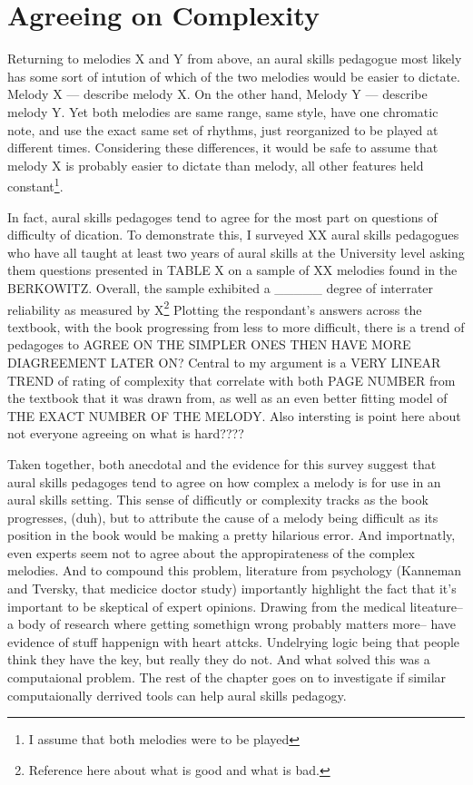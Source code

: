 \documentclass[]{book}
\let\rmarkdownfootnote\footnote%
\def\footnote{\protect\rmarkdownfootnote}
\begin{document}
\hypertarget{agreeing-on-complexity}{%
\section{Agreeing on Complexity}\label{agreeing-on-complexity}}

Returning to melodies X and Y from above, an aural skills pedagogue most likely has some sort of intution of which of the two melodies would be easier to dictate.
Melody X --- describe melody X.
On the other hand, Melody Y --- describe melody Y.
Yet both melodies are same range, same style, have one chromatic note, and use the exact same set of rhythms, just reorganized to be played at different times.
Considering these differences, it would be safe to assume that melody X is probably easier to dictate than melody, all other features held constant\footnote{I assume that both melodies were to be played}.

In fact, aural skills pedagoges tend to agree for the most part on questions of difficulty of dication.
To demonstrate this, I surveyed XX aural skills pedagogues who have all taught at least two years of aural skills at the University level asking them questions presented in TABLE X on a sample of XX melodies found in the BERKOWITZ.
Overall, the sample exhibited a \_\_\_\_\_ degree of interrater reliability as measured by X\footnote{Reference here about what is good and what is bad.}
Plotting the respondant's answers across the textbook, with the book progressing from less to more difficult, there is a trend of pedagoges to AGREE ON THE SIMPLER ONES THEN HAVE MORE DIAGREEMENT LATER ON?
Central to my argument is a VERY LINEAR TREND of rating of complexity that correlate with both PAGE NUMBER from the textbook that it was drawn from, as well as an even better fitting model of THE EXACT NUMBER OF THE MELODY.
Also intersting is point here about not everyone agreeing on what is hard????

Taken together, both anecdotal and the evidence for this survey suggest that aural skills pedagoges tend to agree on how complex a melody is for use in an aural skills setting.
This sense of difficutly or complexity tracks as the book progresses, (duh), but to attribute the cause of a melody being difficult as its position in the book would be making a pretty hilarious error.
And importnatly, even experts seem not to agree about the appropirateness of the complex melodies.
And to compound this problem, literature from psychology (Kanneman and Tversky, that medicice doctor study) importantly highlight the fact that it's important to be skeptical of expert opinions.
Drawing from the medical liteature-- a body of research where getting somethign wrong probably matters more-- have evidence of stuff happenign with heart attcks.
Undelrying logic being that people think they have the key, but really they do not.
And what solved this was a computaional problem.
The rest of the chapter goes on to investigate if similar computaionally derrived tools can help aural skills pedagogy.
\end{document}
